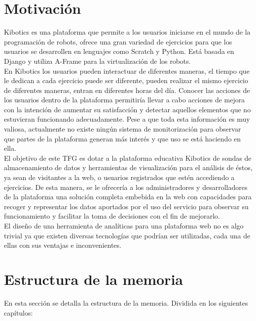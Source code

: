 \documentclass[a4paper, 12pt]{book}
\begin{document}
	\section{Motivación}
	\label{sec:motivación}
		Kibotics es una plataforma que permite a los usuarios iniciarse en el mundo de la programación de robots, ofrece una gran variedad de ejercicios para que los usuarios se desarrollen en lenguajes como Scratch y Python. Está basada en Django y utiliza A-Frame para la virtualización de los robots.\\
		
		En Kibotics los usuarios pueden interactuar de diferentes maneras, el tiempo que le dedican a cada ejercicio puede ser diferente, pueden realizar el mismo ejercicio de diferentes maneras, entran en diferentes horas del día. Conocer las acciones de los usuarios dentro de la plataforma permitiría llevar a cabo acciones de mejora con la intención de aumentar su satisfacción y detectar aquellos elementos que no estuvieran funcionando adecuadamente. Pese a que toda esta información es muy valiosa, actualmente no existe ningún sistema de monitorización para observar que partes de la plataforma generan más interés y que uso se está haciendo en ella.  \\

		El objetivo de este TFG es dotar a la plataforma educativa Kibotics de sondas de almacenamiento de datos y herramientas de visualización para el análisis de éstos, ya sean de visitantes a la web, o usuarios registrados que estén accediendo a ejercicios. De esta manera, se le ofrecería a los administradores y desarrolladores de la plataforma una solución completa embebida en la web con capacidades para recoger y representar los datos aportados por el uso del servicio para observar su funcionamiento y facilitar la toma de decisiones con el fin de mejorarlo. \\
			
		El diseño de una herramienta de analíticas para una plataforma web no es algo trivial ya que existen diversas tecnologías que podrían ser utilizadas, cada una de ellas con sus ventajas e inconvenientes. 
		
		
	\section{Estructura de la memoria}
	\label{sec:1_estructura_memoria}
	En esta sección se detalla la estructura de la memoria. Dividida en los siguientes capítulos:
	
\end{document}
